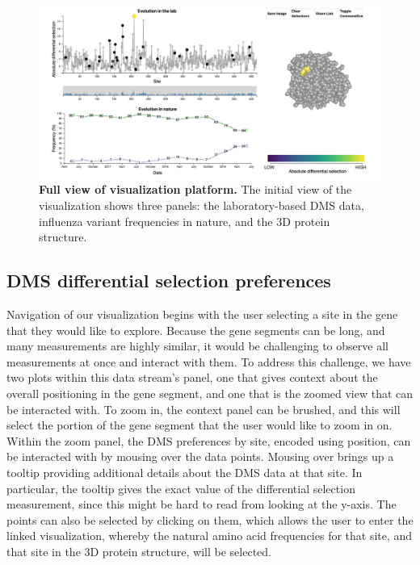 \documentclass[sigchi]{acmart}
\begin{document}
\begin{figure}[H]
	\includegraphics[width=1.0\textwidth]{viz-overview.png}
	\caption{\textbf{Full view of visualization platform.}
   The initial view of the visualization shows three panels: the laboratory-based DMS data, influenza variant frequencies in nature, and the 3D protein structure.
	}
	\label{overview}
\end{figure}

\subsection{DMS differential selection preferences}
Navigation of our visualization begins with the user selecting a site in the gene that they would like to explore. Because the gene segments can be long, and many measurements are highly similar, it would be challenging to observe all measurements at once and interact with them. To address this challenge, we have two plots within this data stream’s panel, one that gives context about the overall positioning in the gene segment, and one that is the zoomed view that can be interacted with.  To zoom in, the context panel can be brushed, and this will select the portion of the gene segment that the user would like to zoom in on. Within the zoom panel, the DMS preferences by site, encoded using position, can be interacted with by mousing over the data points. Mousing over brings up a tooltip providing additional details about the DMS data at that site. In particular, the tooltip gives the exact value of the differential selection measurement, since this might be hard to read from looking at the y-axis. The points can also be selected by clicking on them, which allows the user to enter the linked visualization, whereby the natural amino acid frequencies for that site, and that site in the 3D protein structure, will be selected.
\end{document}

